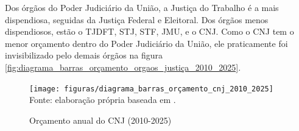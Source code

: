 Dos órgãos do Poder Judiciário da União, a Justiça do Trabalho é a mais dispendiosa, seguidas da Justiça Federal e Eleitoral. Dos órgãos menos dispendiosos, estão o TJDFT, STJ, STF, JMU, e o CNJ. Como o CNJ tem o menor orçamento dentro do Poder Judiciário da União, ele praticamente foi invisibilizado pelo demais órgãos na figura \ref{fig:diagrama_barras_orçamento_orgaos_justiça_2010_2025}.

\begin{figure}[H]
	\centering
	\caption{Orçamento anual do CNJ (2010-2025)} 
	\texttt{[image: figuras/diagrama\_barras\_orçamento\_cnj\_2010\_2025]}
	\label{fig:diagrama_barras_orçamento_cnj_2010_2025}
	\footnotesize{Fonte: elaboração própria baseada em \cite{}.}
\end{figure}












